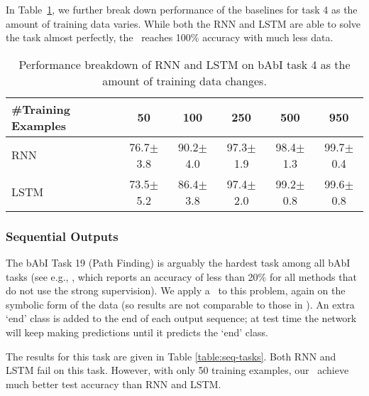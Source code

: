 In Table~\ref{table:task4-breakdown}, we further break down performance of the baselines for task 4 as the amount
of training data varies. While both the RNN and LSTM are able to solve the task
almost perfectly, the \OurMethodMinorShort~reaches 100\% accuracy with much less
data.

\begin{table}[ht]
    \centering
    \begin{tabular}{@{}lccccc@{}}
        \toprule
        \#Training Examples    & 50    & 100   & 250   & 500   & 950 \\
        \midrule
        RNN  & 76.7$\pm$3.8 & 90.2$\pm$4.0 & 97.3$\pm$1.9 & 98.4$\pm$1.3 & 99.7$\pm$0.4 \\
        LSTM & 73.5$\pm$5.2 & 86.4$\pm$3.8 & 97.4$\pm$2.0 & 99.2$\pm$0.8 & 99.6$\pm$0.8 \\
        \bottomrule
    \end{tabular}
    \caption{Performance breakdown of RNN and LSTM on bAbI task 4 as the
    amount of training data changes.}
  \label{table:task4-breakdown}
\end{table}



\subsubsection{Sequential Outputs}

The bAbI Task 19 (Path Finding) is arguably the hardest task among all bAbI
tasks (see
e.g., \citep{sukhbaatar2015end}, which reports an accuracy of less than 20\% for
all methods that do not use the strong supervision). We apply a \OurMethodShort~to
this problem, again on the symbolic form of the data (so results are not comparable
to those in \citep{sukhbaatar2015end}).
An extra `end' class is added to the end of each output sequence;
at test time the network
will keep making predictions until it predicts the `end' class.


The results for this task are given in Table \ref{table:seq-tasks}.
Both RNN and LSTM fail on this task. However, with only 50
training examples, our \OurMethodShorts~achieve much better test
accuracy than RNN and LSTM.

